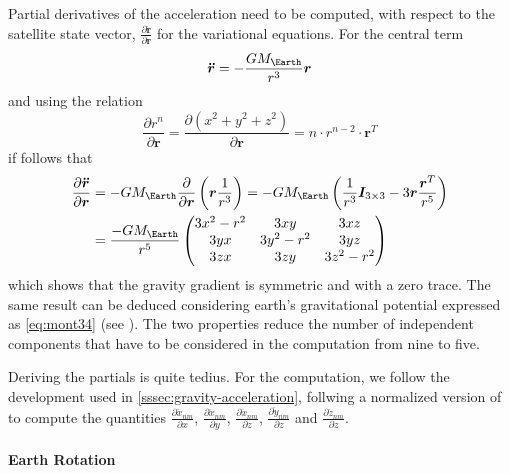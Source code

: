 Partial derivatives of the acceleration need to be computed, with respect to the 
satellite state vector, $\frac{\partial \bm{\ddot{r}}}{\partial \bm{r}}$ for the variational 
equations. For the central term
\begin{equation}
  \bm{\ddot{r}} = - \frac{GM_{\Earth}}{r^3}\bm{r}
\end{equation}
and using the relation
\begin{equation}
  \frac{\partial r^n}{\partial \bm{r}} = 
    \frac{\partial \left(x^2 + y^2 + z^2 \right)}{\partial \bm{r}} = 
      n \cdot r^{n-2} \cdot \bm{r}^T
\end{equation}
if follows that
\begin{equation}
  \begin{aligned}
    \frac{\partial \bm{\ddot{r}}}{\partial \bm{r}} &= 
    -GM_{\Earth} \frac{\partial}{\partial \bm{r}}\left( \bm{r} \frac{1}{r^3} \right) = 
    -GM_{\Earth} \left( \frac{1}{r^3}\bm{I}_{3\times 3} - 3\bm{r} \frac{\bm{r}^T}{r^5} \right) \\
    &=\frac{-GM_{\Earth}}{{r^5}} \begin{pmatrix}
      3x^2-r^2 & 3xy      & 3xz \\
      3yx      & 3y^2-r^2 & 3yz \\
      3zx      & 3zy      & 3z^2 -r^2
    \end{pmatrix}
  \end{aligned}
\end{equation}
which shows that the gravity gradient is symmetric and with a zero trace. The same result 
can be deduced considering earth's gravitational potential expressed as \ref{eq:mont34} 
(see \cite{Montenbruck2000}). The two properties reduce the number of independent 
components that have to be considered in the computation from nine to five. 

Deriving the partials is quite tedius. For the computation, we follow the development 
used in \ref{sssec:gravity-acceleration}, follwing a normalized version of 
\cite{Cunningham1970} to compute the quantities $\frac{\partial \ddot{x}_{nm}}{\partial x}$, 
$\frac{\partial \ddot{x}_{nm}}{\partial y}$, $\frac{\partial \ddot{x}_{nm}}{\partial z}$, 
$\frac{\partial \ddot{y}_{nm}}{\partial z}$ and $\frac{\partial \ddot{z}_{nm}}{\partial z}$.

\paragraph{Earth Rotation}\label{sssec:gravity-acceleration-earth-rotation}

